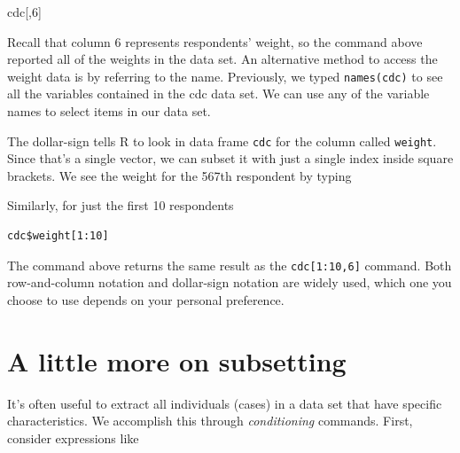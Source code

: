 \documentclass[]{book}
\newenvironment{Shaded}{\begin{snugshade}}{\end{snugshade}}
\newcommand{\DecValTok}[1]{\textcolor[rgb]{0.00,0.00,0.81}{{#1}}}
\newcommand{\NormalTok}[1]{{#1}}
\theoremstyle{definition}
\theoremstyle{definition}
\theoremstyle{definition}
\theoremstyle{remark}
\begin{document}
\begin{Shaded}
\begin{Highlighting}[]
\NormalTok{cdc[,}\DecValTok{6}\NormalTok{]}
\end{Highlighting}
\end{Shaded}

Recall that column 6 represents respondents' weight, so the command
above reported all of the weights in the data set. An alternative method
to access the weight data is by referring to the name. Previously, we
typed \texttt{names(cdc)} to see all the variables contained in the cdc
data set. We can use any of the variable names to select items in our
data set.

\begin{Shaded}
\end{Shaded}

The dollar-sign tells R to look in data frame \texttt{cdc} for the
column called \texttt{weight}. Since that's a single vector, we can
subset it with just a single index inside square brackets. We see the
weight for the 567th respondent by typing

\begin{Shaded}
\end{Shaded}

Similarly, for just the first 10 respondents

\begin{verbatim}
cdc$weight[1:10]
\end{verbatim}

The command above returns the same result as the
\texttt{cdc{[}1:10,6{]}} command. Both row-and-column notation and
dollar-sign notation are widely used, which one you choose to use
depends on your personal preference.

\section{A little more on subsetting}\label{a-little-more-on-subsetting}

It's often useful to extract all individuals (cases) in a data set that
have specific characteristics. We accomplish this through
\emph{conditioning} commands. First, consider expressions like
\end{document}
